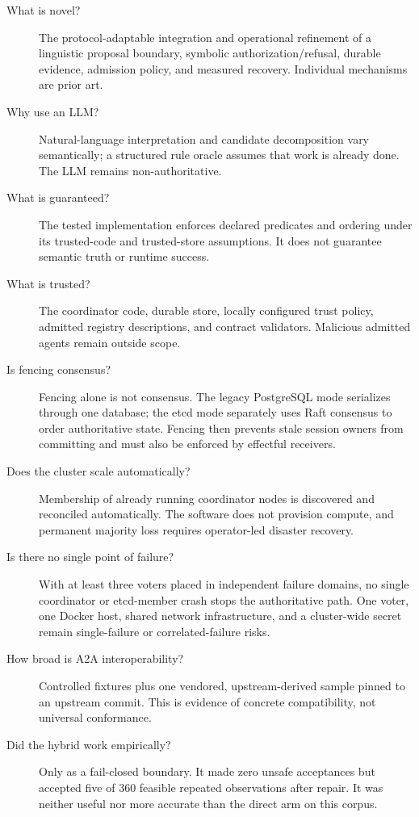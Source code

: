 \begin{description}
  \item[What is novel?] The protocol-adaptable integration and operational refinement of a linguistic proposal boundary, symbolic authorization/refusal, durable evidence, admission policy, and measured recovery. Individual mechanisms are prior art.
  \item[Why use an LLM?] Natural-language interpretation and candidate decomposition vary semantically; a structured rule oracle assumes that work is already done. The LLM remains non-authoritative.
  \item[What is guaranteed?] The tested implementation enforces declared predicates and ordering under its trusted-code and trusted-store assumptions. It does not guarantee semantic truth or runtime success.
  \item[What is trusted?] The coordinator code, durable store, locally configured trust policy, admitted registry descriptions, and contract validators. Malicious admitted agents remain outside scope.
  \item[Is fencing consensus?] Fencing alone is not consensus. The legacy PostgreSQL mode serializes through one database; the etcd mode separately uses Raft consensus to order authoritative state. Fencing then prevents stale session owners from committing and must also be enforced by effectful receivers.
  \item[Does the cluster scale automatically?] Membership of already running coordinator nodes is discovered and reconciled automatically. The software does not provision compute, and permanent majority loss requires operator-led disaster recovery.
  \item[Is there no single point of failure?] With at least three voters placed in independent failure domains, no single coordinator or etcd-member crash stops the authoritative path. One voter, one Docker host, shared network infrastructure, and a cluster-wide secret remain single-failure or correlated-failure risks.
  \item[How broad is A2A interoperability?] Controlled fixtures plus one vendored, upstream-derived sample pinned to an upstream commit. This is evidence of concrete compatibility, not universal conformance.
  \item[Did the hybrid work empirically?] Only as a fail-closed boundary. It made zero unsafe acceptances but accepted five of 360 feasible repeated observations after repair. It was neither useful nor more accurate than the direct arm on this corpus.

\end{description}
